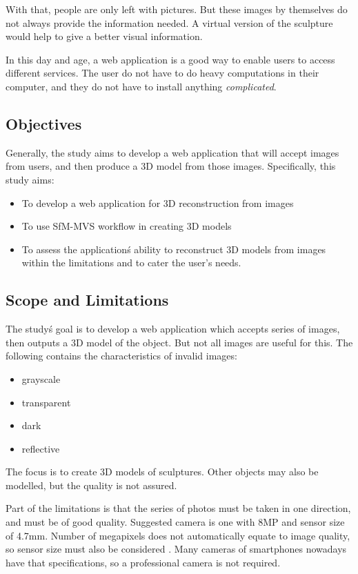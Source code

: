 \documentclass[journal]{./IEEE/IEEEtran}
\begin{document}
With that, people are only left with pictures. But these images by themselves do not always provide the information needed. A virtual version of the sculpture would help to give a better visual information.

In this day and age, a web application is a good way to enable users to access different services. The user do not have to do heavy computations in their computer, and they do not have to install anything \textit{complicated}.

\subsection{Objectives}
Generally, the study aims to develop a web application that will accept images from users, and then produce a 3D model from those images. Specifically, this study aims:

\begin{itemize}
\item To develop a web application for 3D reconstruction from images
\item To use SfM-MVS workflow in creating 3D models
\item To assess the application\'s ability to reconstruct 3D models from images within the limitations and to cater the user's needs.
\end{itemize}

\subsection{Scope and Limitations}
The study\'s goal is to develop a web application which accepts series of images, then outputs a 3D model of the object. But not all images are useful for this. The following contains the characteristics of invalid images:

\begin{itemize}
\item grayscale
\item transparent
\item dark
\item reflective
\end{itemize}

The focus is to create 3D models of sculptures. Other objects may also be modelled, but the quality is not assured.

Part of the limitations is that the series of photos must be taken in one direction, and must be of good quality. Suggested camera is one with 8MP and sensor size of 4.7mm. Number of megapixels does not automatically equate to image quality, so sensor size must also be considered \cite{Shu}. Many cameras of smartphones nowadays have that specifications, so a professional camera is not required.
\end{document}
